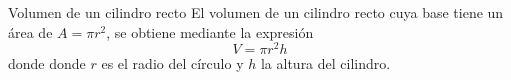 
\begin{infocard}{Volumen de un cilindro recto}
    El volumen de un cilindro recto cuya base tiene un área de $A=\pi r^2$, se obtiene mediante la expresión
    \[
        V = \pi r^2h
    \]
    donde donde $r$ es el radio del círculo y $h$ la altura del cilindro.
\end{infocard}



